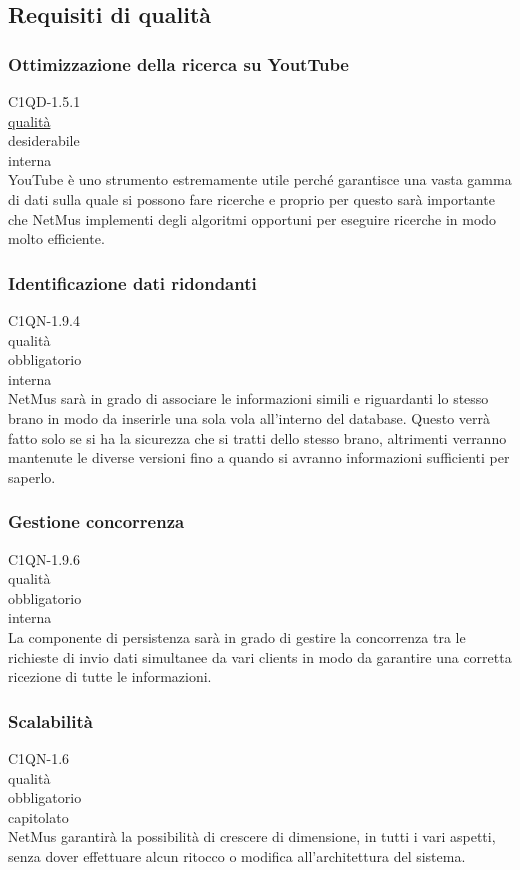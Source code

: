 \subsection{Requisiti di qualit\`a}

\subsubsection*{Ottimizzazione della ricerca su YoutTube}
 C1QD-1.5.1 \\
 \underline{qualit\`a} \\
 desiderabile \\
 interna \\
YouTube \`e uno strumento estremamente utile perch\'e garantisce una vasta gamma
di dati sulla quale si possono fare ricerche e proprio per questo sar\`a
importante che NetMus implementi degli algoritmi opportuni per eseguire ricerche
in modo molto efficiente.

\subsubsection*{Identificazione dati ridondanti}
 C1QN-1.9.4 \\
 qualit\`a \\
 obbligatorio \\
 interna \\
NetMus sar\`a in grado di associare le informazioni simili e
riguardanti lo stesso brano in modo da inserirle una sola vola all'interno del
database. Questo verr\`a fatto solo se si ha la sicurezza che si tratti dello
stesso brano, altrimenti verranno mantenute le diverse versioni fino a quando si
avranno informazioni sufficienti per saperlo.

\subsubsection*{Gestione concorrenza}
 C1QN-1.9.6 \\
 qualit\`a \\
 obbligatorio \\
 interna \\
La componente di persistenza sar\`a in grado di gestire la concorrenza tra le
richieste di invio dati simultanee da vari clients in modo da garantire una
corretta ricezione di tutte le informazioni.

\subsubsection*{Scalabilit\`a}
 C1QN-1.6 \\
 qualit\`a \\
 obbligatorio \\
 capitolato \\
NetMus garantir\`a la possibilit\`a di crescere di dimensione, in tutti i vari
aspetti, senza dover effettuare alcun ritocco o modifica all'architettura del
sistema.

